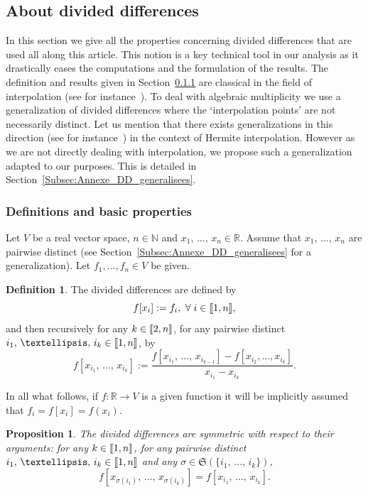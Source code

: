 \documentclass[11pt]{article}
\newtheorem{prop}[theo]{Proposition}
\theoremstyle{definition}
\newtheorem{defi}[theo]{Definition}
\numberwithin{equation}{section}
\numberwithin{figure}{section}
\numberwithin{table}{section}
\newcommand{\llbracket}{\mathopen{[\mkern -2.7mu[}}
\newcommand{\rrbracket}{\mathclose{]\mkern -2.7mu]}}
\newcommand{\inter}[2]{\llbracket #1,#2 \rrbracket}
\newcommand{\N}{\mathbb{N}}
\newcommand{\R}{\mathbb{R}}
\let\oldforall\forall
\renewcommand*{\forall}{\mathrel{\oldforall}}
\begin{document}
\subsection{About divided differences} \label{Annexe_DD}


In this section we give all the properties concerning divided differences that are used all along this article. This notion is a key technical tool in our analysis as it drastically eases the computations and the formulation of the results. The definition and results given in Section~\ref{Subsec:Annexe_DD_classique} are classical in the field of interpolation (see for instance~\cite[Chapter 5]{Powell_1981}). To deal with algebraic multiplicity we use a generalization of divided differences where the `interpolation points' are not necessarily distinct. Let us mention that there exists generalizations in this direction (see for instance~\cite[Chapter 5]{Powell_1981}) in the context of Hermite interpolation. However as we are not directly dealing with interpolation, we propose such a generalization adapted to our purposes. This is detailed in Section~\ref{Subsec:Annexe_DD_generalisees}.

\subsubsection{Definitions and basic properties} \label{Subsec:Annexe_DD_classique}

Let $V$ be a real vector space, $n \in \N$ and $x_1,\,\dots,\,x_n \in \R$. Assume that $x_1,\,\dots,\,x_n$ are pairwise distinct (see Section~\ref{Subsec:Annexe_DD_generalisees} for a generalization). Let $f_1,\dotsc,f_n\in V$ be given.

\begin{defi} \label{Def:DifferencesDivisees}
The divided differences are defined by
\[
f[x_i]:=f_i,\ \forall i\in \inter{1}{n},
\]
and then recursively for any $k \in \inter{2}{n}$, for any pairwise distinct $i_1,\,\dots,\, i_k \in \inter{1}{n}$, by
\[
f[x_{i_1},\,\dots,\,x_{i_k}] := \frac{f[x_{i_1},\,\dots,\,x_{i_{k-1}}]-f[x_{i_2}, \dots, x_{i_k}]}{x_{i_1}-x_{i_k}}.
\]
\end{defi}
In all what follows, if $f : \R \to V$ is a given function it will be implicitly assumed that $f_i=f[x_i]=f(x_i)$.


\begin{prop}\label{Prop:DifferencesDiviseesSymetriques}
The divided differences are symmetric with respect to their arguments: for any $k \in \inter{1}{n}$, for any pairwise distinct $i_1,\,\dots,\,i_k \in \inter{1}{n}$ and any $\sigma \in \mathfrak{S}(\{i_1,\,\dotsc,\,i_k\})$,
\[
f[x_{\sigma(i_1)},\,\dots,\,x_{\sigma(i_k)}] = f[x_{i_1},\,\dots,\,x_{i_k}].
\]
\end{prop}
\end{document}
